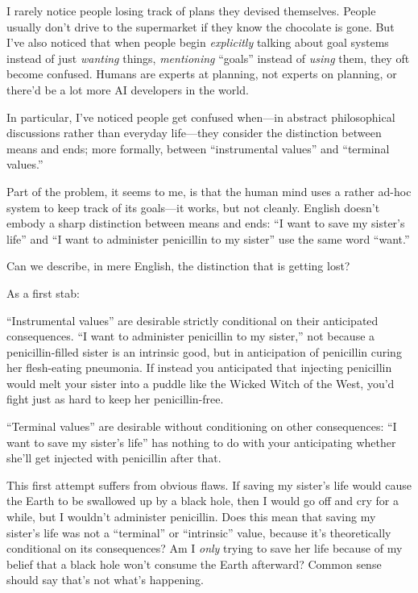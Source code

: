 {
 I rarely notice people losing track of plans they devised
themselves. People usually don't drive to the
supermarket if they know the chocolate is gone. But
I've also noticed that when people begin
\textit{explicitly} talking about goal systems instead of just
\textit{wanting} things, \textit{mentioning}
``goals'' instead of \textit{using}
them, they oft become confused. Humans are experts at planning, not
experts on planning, or there'd be a lot more AI
developers in the world.}

{
 In particular, I've noticed people get confused
when---in abstract philosophical discussions rather than everyday
life---they consider the distinction between means and ends; more
formally, between ``instrumental
values'' and ``terminal
values.''}

{
 Part of the problem, it seems to me, is that the human mind uses a
rather ad-hoc system to keep track of its goals---it works, but not
cleanly. English doesn't embody a sharp distinction
between means and ends: ``I want to save my
sister's life'' and
``I want to administer penicillin to my
sister'' use the same word
``want.''}

{
 Can we describe, in mere English, the distinction that is getting
lost?}

{
 As a first stab:}

{
 ``Instrumental values'' are
desirable strictly conditional on their anticipated consequences.
``I want to administer penicillin to my
sister,'' not because a penicillin-filled sister is
an intrinsic good, but in anticipation of penicillin curing her
flesh-eating pneumonia. If instead you anticipated that injecting
penicillin would melt your sister into a puddle like the Wicked Witch
of the West, you'd fight just as hard to keep her
penicillin-free.}

{
 ``Terminal values'' are
desirable without conditioning on other consequences:
``I want to save my sister's
life'' has nothing to do with your anticipating
whether she'll get injected with penicillin after
that.}

{
 This first attempt suffers from obvious flaws. If saving my
sister's life would cause the Earth to be swallowed up
by a black hole, then I would go off and cry for a while, but I
wouldn't administer penicillin. Does this mean that
saving my sister's life was not a
``terminal'' or
``intrinsic'' value, because
it's theoretically conditional on its consequences? Am
I \textit{only} trying to save her life because of my belief that a
black hole won't consume the Earth afterward? Common
sense should say that's not what's
happening.}

